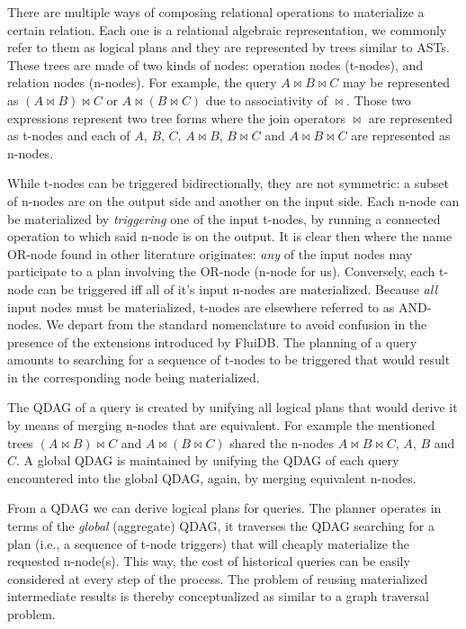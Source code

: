 There are multiple ways of composing relational operations to
materialize a certain relation. Each one is a relational algebraic
representation, we commonly refer to them as logical plans and they
are represented by trees similar to ASTs. These trees are made of two
kinds of nodes: operation nodes (t-nodes), and relation nodes
(n-nodes). For example, the query \(A \Join B \Join C\) may be
represented as \((A \Join B) \Join C\) or \(A \Join (B \Join C)\) due
to associativity of \(\Join\). Those two expressions represent two
tree forms where the join operators \(\Join\) are represented as
t-nodes and each of \(A\), \(B\), \(C\), \(A \Join B\), \(B \Join C\)
and \(A \Join B \Join C\) are represented as n-nodes.

While t-nodes can be triggered bidirectionally, they are not
symmetric: a subset of n-nodes are on the output side and another on
the input side. Each n-node can be materialized by \emph{triggering}
one of the input t-nodes, by running a connected operation to which
said n-node is on the output. It is clear then where the name OR-node
found in other literature originates: \emph{any} of the input nodes may
participate to a plan involving the OR-node (n-node for
us). Conversely, each t-node can be triggered iff all of it's
input n-nodes are materialized. Because \emph{all} input nodes must be
materialized, t-nodes are elsewhere referred to as AND-nodes. We
depart from the standard nomenclature to avoid confusion in the
presence of the extensions introduced by FluiDB. The planning of a
query amounts to searching for a sequence of t-nodes to be triggered
that would result in the corresponding node being materialized.

The QDAG of a query is created by unifying all logical plans that
would derive it by means of merging n-nodes that are equivalent. For
example the mentioned trees \((A \Join B) \Join C\) and \(A \Join (B
\Join C)\) shared the n-nodes \(A \Join B \Join C\), \(A\), \(B\) and
\(C\). A global QDAG is maintained by unifying the QDAG of each query
encountered into the global QDAG, again, by merging equivalent
n-nodes.

From a QDAG we can derive logical plans for queries. The planner
operates in terms of the \emph{global} (aggregate) QDAG, it traverses the QDAG searching
for a plan (i.e., a sequence of t-node triggers) that will cheaply
materialize the requested n-node(s). This way, the cost of historical queries can be
easily considered at every step of the process. The problem of reusing materialized intermediate
results is thereby conceptualized as similar to a graph traversal problem.


